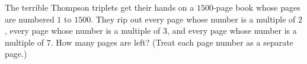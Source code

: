 The terrible Thompson triplets get their hands on a $1500$-page book whose pages are numbered $1$ to $1500$. They rip out every page whose number is a multiple of $2$, every page whose number is a multiple of $3$, and every page whose number is a multiple of $7$. How many pages are left? (Treat each page number as a separate page.)
